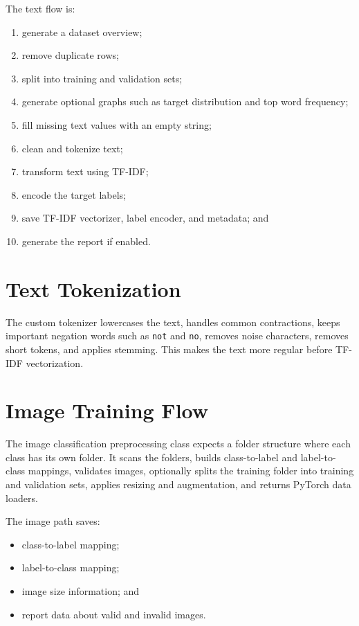 \documentclass[12pt,a4paper,oneside]{report}
\begin{document}
The text flow is:

\begin{enumerate}[leftmargin=*]
  \item generate a dataset overview;
  \item remove duplicate rows;
  \item split into training and validation sets;
  \item generate optional graphs such as target distribution and top word
        frequency;
  \item fill missing text values with an empty string;
  \item clean and tokenize text;
  \item transform text using TF-IDF;
  \item encode the target labels;
  \item save TF-IDF vectorizer, label encoder, and metadata; and
  \item generate the report if enabled.
\end{enumerate}

\section{Text Tokenization}

The custom tokenizer lowercases the text, handles common contractions, keeps
important negation words such as \texttt{not} and \texttt{no}, removes noise
characters, removes short tokens, and applies stemming. This makes the text
more regular before TF-IDF vectorization.

\section{Image Training Flow}

The image classification preprocessing class expects a folder structure where
each class has its own folder. It scans the folders, builds class-to-label and
label-to-class mappings, validates images, optionally splits the training
folder into training and validation sets, applies resizing and augmentation,
and returns PyTorch data loaders.

The image path saves:

\begin{itemize}[leftmargin=*]
  \item class-to-label mapping;
  \item label-to-class mapping;
  \item image size information; and
  \item report data about valid and invalid images.
\end{itemize}
\end{document}

